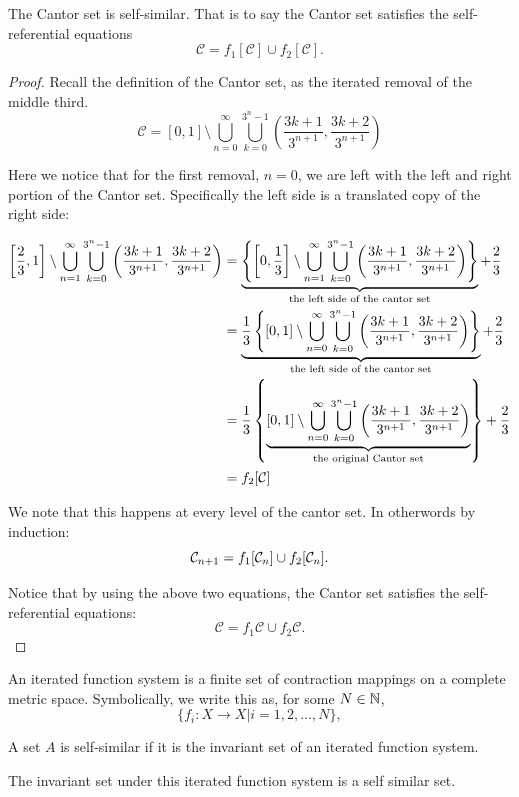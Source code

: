 \begin{proposition}The Cantor set is self-similar.   That is to say the Cantor set satisfies the self-referential equations 
    $$\mathcal{C} = f_1 [\mathcal{C}] \cup f_2 [\mathcal{C}].$$
\end{proposition}
\begin{proof}
    Recall the definition of the Cantor set, as the iterated removal of the middle third.      
    $$\mathcal{C} = [0,1] \setminus \bigcup_{n=0}^\infty\bigcup_{k=0}^{3^n-1}\left(\frac{3k+1}{3^{n+1}},\frac{3k+2}{3^{n+1}}\right)$$

    Here we notice that for the first removal, $n = 0$, we are left with the left and right portion of the Cantor set.  Specifically the left side is a translated copy of the right side:

    \begin{align*}
        \left[\frac{2}{3},1\right] \setminus \bigcup_{n=1}^\infty\bigcup_{k=0}^{3^n-1}\left(\frac{3k+1}{3^{n+1}},\frac{3k+2}{3^{n+1}}\right) &= \underbrace{ \left\{\left[0,\frac{1}{3}\right] \setminus \bigcup_{n=1}^\infty\bigcup_{k=0}^{3^n-1}\left(\frac{3k+1}{3^{n+1}},\frac{3k+2}{3^{n+1}}\right)\right\} }_{\text{the left side of the cantor set}}  + \frac{2}{3}\\
        &= \underbrace{ \frac{1}{3}\left\{[0,1] \setminus \bigcup_{n=0}^\infty\bigcup_{k=0}^{3^n-1}\left(\frac{3k+1}{3^{n+1}},\frac{3k+2}{3^{n+1}}\right)\right\} }_{\text{the left side of the cantor set}}  + \frac{2}{3} \\
        &= \frac{1}{3}\left\{ \underbrace{ [0,1] \setminus \bigcup_{n=0}^\infty\bigcup_{k=0}^{3^n-1}\left(\frac{3k+1}{3^{n+1}},\frac{3k+2}{3^{n+1}}\right) }_{\text{the original Cantor set}} \right\}   + \frac{2}{3} \\
        &=f_2 [\mathcal{C}] 
    \end{align*}

    We note that this happens at every level of the cantor set.  In otherwords by induction:
    $$\mathcal{C}_{n+1} = f_1[\mathcal{C}_n] \cup f_2 [\mathcal{C}_n].$$

    Notice that by using the above two equations, the Cantor set satisfies the self-referential equations:
    $$\mathcal{C} = f_1 \mathcal{C} \cup f_2 \mathcal{C}.$$


\end{proof}
\begin{definition}
    An iterated function system is a finite set of contraction mappings on a complete metric space.  Symbolically, we write this as, for some $N \in \mathbb{N}$,
    $$\{f_i:X \to X \vert i = 1,2,\dots, N\}, $$
\end{definition}

\begin{definition}
    A set $A$ is self-similar if it is the invariant set of an iterated function system. 
\end{definition}


The invariant set under this iterated function system is a self similar set.